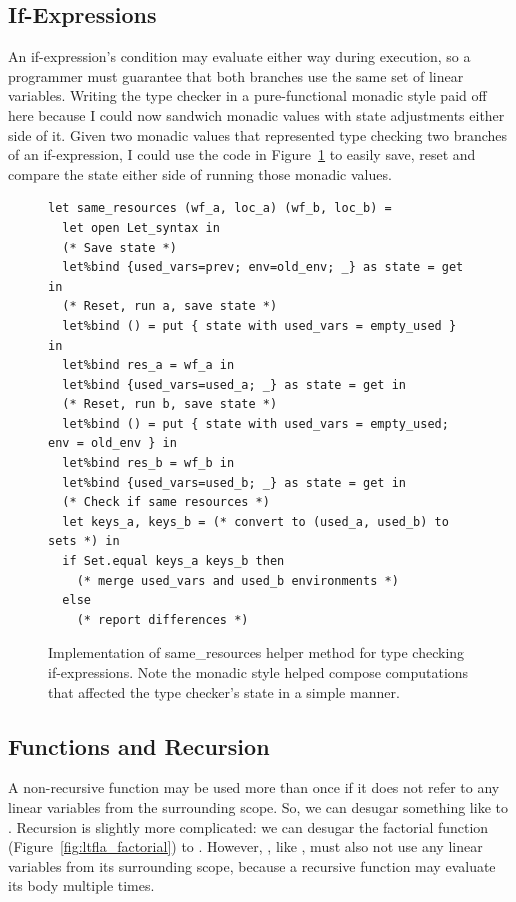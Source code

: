 \subsection{If-Expressions}

An if-expression's condition may evaluate either way during execution, so a
programmer must guarantee that both branches use the same set of linear
variables. Writing the type checker in a pure-functional monadic style paid off
here because I could now sandwich monadic values with state adjustments either
side of it. Given two monadic values that represented type checking two
branches of an if-expression, I could use the code in
Figure~\ref{fig:same_resources} to easily save, reset and compare the state
either side of running those monadic values.

\begin{figure}[tp]
    \centering
    \begin{verbatim}
let same_resources (wf_a, loc_a) (wf_b, loc_b) =
  let open Let_syntax in
  (* Save state *)
  let%bind {used_vars=prev; env=old_env; _} as state = get in
  (* Reset, run a, save state *)
  let%bind () = put { state with used_vars = empty_used } in
  let%bind res_a = wf_a in
  let%bind {used_vars=used_a; _} as state = get in
  (* Reset, run b, save state *)
  let%bind () = put { state with used_vars = empty_used; env = old_env } in
  let%bind res_b = wf_b in
  let%bind {used_vars=used_b; _} as state = get in
  (* Check if same resources *)
  let keys_a, keys_b = (* convert to (used_a, used_b) to sets *) in
  if Set.equal keys_a keys_b then
    (* merge used_vars and used_b environments *)
  else
    (* report differences *)
    \end{verbatim}

    \caption{Implementation of same\_resources helper method for type checking
        if-expressions. Note the monadic style helped compose computations that
        affected the type checker's state in a simple manner.}\label{fig:same_resources}

\end{figure}

\subsection{Functions and Recursion}

A non-recursive function may be used more than once if it does not refer to any
linear variables from the surrounding scope. So, we can desugar something like
 to .  Recursion is slightly
more complicated: we can desugar the factorial function
(Figure~\ref{fig:ltfla_factorial}) to . However, , like , must also
not use any linear variables from its surrounding scope, because a
recursive function may evaluate its body multiple times.

